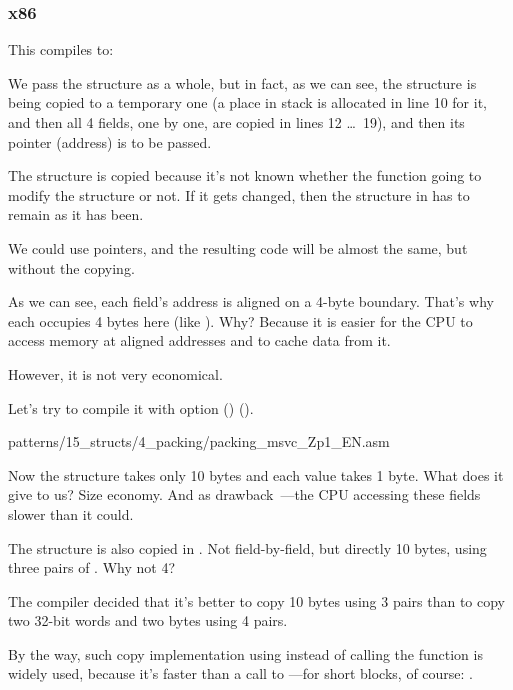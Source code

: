 ﻿\subsubsection{x86}

This compiles to:



We pass the structure as a whole, but in fact, as we can see, the structure
is being copied to a temporary one (a place in stack is allocated in line 10 for it,
and then all 4 fields, one by one, are copied in lines 12 \ldots\ 19), 
and then its pointer (address) is to be passed.

The structure is copied because it's not known whether the \ttf{} 
function going to modify the structure or not.
If it gets changed, then the structure in \main has to remain as it has been.

We could use \CCpp pointers, and the resulting code will be almost the same, but without
the copying.

As we can see, each field's address is aligned on a 4-byte boundary.
That's why each \Tchar occupies 4 bytes here (like \Tint). Why?
Because it is easier for the CPU to access memory at aligned addresses and to cache data from it.

However, it is not very economical.

Let's try to compile it with option () 
().


{patterns/15_structs/4_packing/packing_msvc_Zp1_EN.asm}

Now the structure takes only 10 bytes and each \Tchar value takes 1 byte. What does it give to us?
Size economy. And as drawback~---the CPU accessing these fields slower than it could.

\label{short_struct_copying_using_MOV}

The structure is also copied in \main. Not field-by-field, but directly 10 bytes, using three pairs of \MOV.
Why not 4?

The compiler decided that it's better to copy 10 bytes using 3 \MOV pairs than to copy two 32-bit words
and two bytes using 4 \MOV pairs.

By the way, such copy implementation using \MOV instead of calling the  function is widely
used, because it's faster than a call to ---for short blocks, of course:
.

